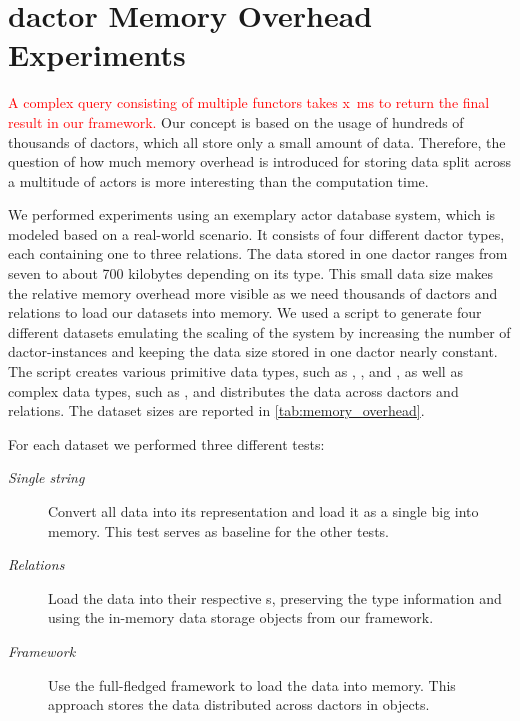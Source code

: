 
\section[Dactor Memory Overhead Experiments]{\Gls{dactor} Memory Overhead Experiments}\label{sec:experiments}

  \textcolor{red}{
  A complex query consisting of multiple \glspl{functor} takes x~ms to return the final result in our framework.
  }
  Our concept is based on the usage of hundreds of thousands of \glspl{dactor}, which all store only a small amount of data.
  Therefore, the question of how much memory overhead is introduced for storing data split across a multitude of actors is more interesting than the computation time.

  We performed experiments using an exemplary actor database system, which is modeled based on a real-world scenario.
  It consists of four different \gls{dactor} types, each containing one to three relations.
  The data stored in one \gls{dactor} ranges from seven to about 700 kilobytes depending on its type.
  This small data size makes the relative memory overhead more visible as we need thousands of \glspl{dactor} and relations to load our datasets into memory.
  We used a script to generate four different datasets emulating the scaling of the system by increasing the number of \gls{dactor}-instances and keeping the data size stored in one \gls{dactor} nearly constant.
  The script creates various primitive data types, such as , , and , as well as complex data types, such as , and distributes the data across \glspl{dactor} and relations.
  The dataset sizes are reported in \cref{tab:memory_overhead}.

  For each dataset we performed three different tests:
  \begin{description}
    \item[\textit{Single string}] Convert all data into its  representation and load it as a single big  into memory.
    This test serves as baseline for the other tests.
    \item[\textit{Relations}] Load the data into their respective s, preserving the type information and using the in-memory data storage objects from our framework.
    \item[\textit{Framework}] Use the full-fledged framework to load the data into memory.
    This approach stores the data distributed across \glspl{dactor} in  objects.
  \end{description}


